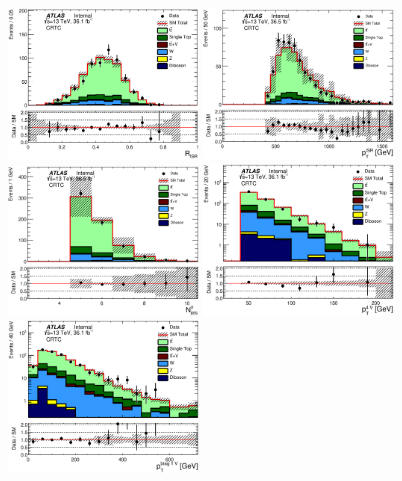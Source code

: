 \begin{figure}[h!]
  \centering
    \includegraphics[width=0.45\textwidth]{figures/ttbar/postfit/CA_RISR_CRTopC}
    \includegraphics[width=0.45\textwidth]{figures/ttbar/postfit/CA_pTISR_CRTopC}
    \includegraphics[width=0.45\textwidth]{figures/ttbar/postfit/CA_NjV_CRTopC}
    \includegraphics[width=0.45\textwidth]{figures/ttbar/postfit/CA_pTjV4_CRTopC_log}
    \includegraphics[width=0.45\textwidth]{figures/ttbar/postfit/CA_pTbV1_CRTopC_log}

\end{figure}
